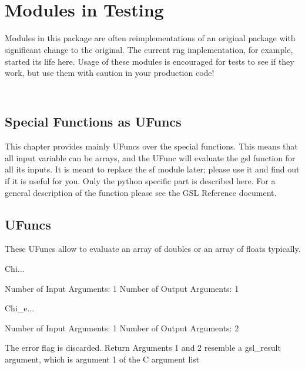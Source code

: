 \chapter[\protect\module{pygsl.testing} ---  Modules in Testing]
{\protect{} \\ Modules in Testing}
\label{cha:statistics-module}


Modules in this package are often reimplementations of an original package
with significant change to the original. The current rng implementation, for
example, started its life here. Usage of these modules is encouraged for tests
to see if they work, but use them with caution in your production code!

\section[\protect\module{pygsl.testing.sf} --- Special UFuncs]
{\protect{} \\ Special Functions as UFuncs}


This chapter provides mainly \numpy{} UFuncs over the special functions. This means
that all input variable can be arrays, and the UFunc will evaluate the gsl
function for all its inputs. It is meant to replace the sf module later;
please use it and find out if it is useful for you. 
Only the python specific part is described here. For a general description of
the function please see the GSL Reference document.  

\section{UFuncs}
These UFuncs allow to evaluate an array of doubles or an array of floats typically.
\begin{funcdesc}{Chi}{...}

    Number of Input  Arguments:  1
    Number of Output Arguments:  1
\end{funcdesc}

\begin{funcdesc}{Chi_e}{...}

    Number of Input  Arguments:  1
    Number of Output Arguments:  2

The error flag is discarded.
Return Arguments 1 and 2 resemble a gsl_result argument,
	which is  argument 1 of the C argument list

\end{funcdesc}

